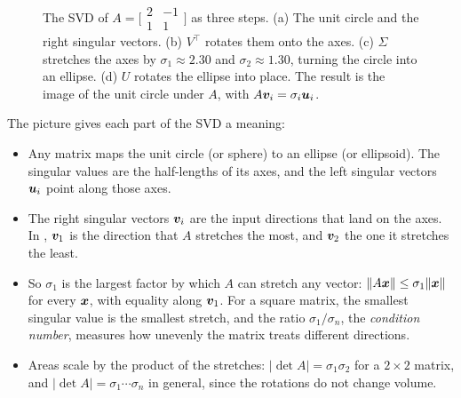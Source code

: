 \begin{figure}[ht]
  \caption{The SVD of $A = \bigl[\begin{smallmatrix} 2 & -1 \\ 1 & 1
    \end{smallmatrix}\bigr]$ as three steps. (a) The unit circle and the
    right singular vectors. (b) $V^\top$ rotates them onto the axes. (c)
    $\Sigma$ stretches the axes by $\sigma_1 \approx 2.30$ and $\sigma_2
    \approx 1.30$, turning the circle into an ellipse. (d) $U$ rotates the
    ellipse into place. The result is the image of the unit circle under
    $A$, with $A\bm{v}_i = \sigma_i \bm{u}_i$.}
  \label{fig:ch04-svd}
\end{figure}

The picture gives each part of the SVD a meaning:
\begin{itemize}
  \item Any matrix maps the unit circle (or sphere) to an ellipse (or
    ellipsoid). The singular values are the half-lengths of its axes, and
    the left singular vectors $\bm{u}_i$ point along those axes.
  \item The right singular vectors $\bm{v}_i$ are the input directions
    that land on the axes. In , $\bm{v}_1$ is the
    direction that $A$ stretches the most, and $\bm{v}_2$ the one it
    stretches the least.
  \item So $\sigma_1$ is the largest factor by which $A$ can stretch any
    vector: $\|A\bm{x}\| \le \sigma_1 \|\bm{x}\|$ for every $\bm{x}$,
    with equality along $\bm{v}_1$. For a square matrix, the smallest
    singular value is the smallest stretch, and the ratio
    $\sigma_1 / \sigma_n$, the \emph{condition number}, measures how
    unevenly the matrix treats different directions.
  \item Areas scale by the product of the stretches: $|\det A| =
    \sigma_1 \sigma_2$ for a $2 \times 2$ matrix, and $|\det A| =
    \sigma_1 \cdots \sigma_n$ in general, since the rotations do not change
    volume.
\end{itemize}

